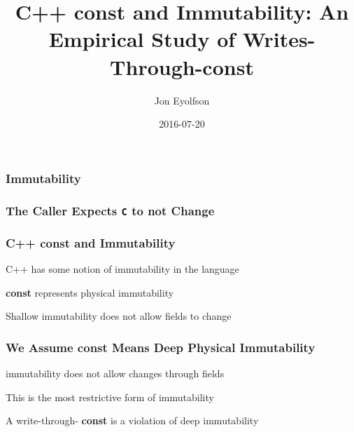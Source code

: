 \documentclass[aspectratio=169]{beamer}
\title{C++ const and Immutability: An Empirical Study of
       Writes-Through-const}
\author{Jon Eyolfson}
\date{2016-07-20}
\newcommand{\const}{{\color{blue} \bfseries \ttfamily const}}
\begin{document}
  \begin{frame}[plain]
    \titlepage
  \end{frame}

  \begin{frame}
    \frametitle{Immutability}
    \centering
  \end{frame}

  \begin{frame}
    \frametitle{The Caller Expects \texttt{C} to not Change}
    \large
    \centering
  \end{frame}

  \begin{frame}
    \frametitle{C++ \const{} and Immutability}
    \Large
    C++ has some notion of immutability in the language

    \vspace{1em}
    \const{} represents  physical immutability

    \vspace{1em}
    Shallow immutability does not allow fields to change

    \vspace{1em}
    \centering
  \end{frame}

  \begin{frame}
    \frametitle{We Assume \const{} Means Deep Physical Immutability}
    \Large

     immutability does not allow changes through fields

    \vspace{1em}
    This is the most restrictive form of immutability

    \vspace{1em}
    A write-through-\const{} is a violation of deep immutability

    \vspace{1em}
    \centering
  \end{frame}
\end{document}

